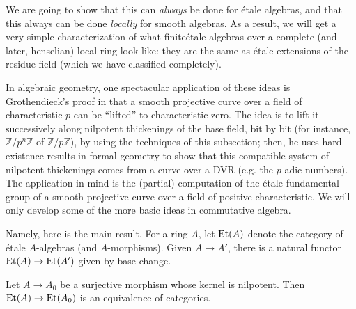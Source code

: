 We are going to show that this can \emph{always} be done for \'etale
algebras, and that this always can be done \emph{locally} for smooth
algebras. As a result, we will get a very simple characterization of what
finite\'etale algebras over a complete (and later, henselian) local ring look like:
they are the same as \'etale extensions of the residue field (which we have
classified completely).

In algebraic geometry, one spectacular application of these ideas is
Grothendieck's proof in \cite{SGA1} that a smooth projective curve over a field
of characteristic $p$ can be ``lifted'' to characteristic zero. The idea is to
lift it successively along nilpotent thickenings of the base field, bit by bit
(for instance, $\mathbb{Z}/p^n \mathbb{Z}$ of $\mathbb{Z}/p\mathbb{Z}$),
by using the techniques of this subsection; then, he uses hard existence
results in formal geometry to show that this compatible system of nilpotent
thickenings comes from a curve over a DVR (e.g. the $p$-adic numbers). The
application in mind is the (partial) computation of the \'etale fundamental
group of a smooth projective curve over a field of positive characteristic.
We will only develop some of the more basic ideas in commutative algebra. 

Namely, here is the main result.
For a ring $A$, let $\mathrm{Et}(A)$ denote the category of \'etale $A$-algebras (and
$A$-morphisms). Given $A \to A'$, there is  a natural functor $\mathrm{Et}(A) \to
\mathrm{Et}(A')$  given by base-change.
\begin{theorem} 
Let $A \to A_0$ be a surjective morphism whose kernel is nilpotent. Then
$\mathrm{Et}(A) \to \mathrm{Et}(A_0)$ is an equivalence of categories.
\end{theorem} 

